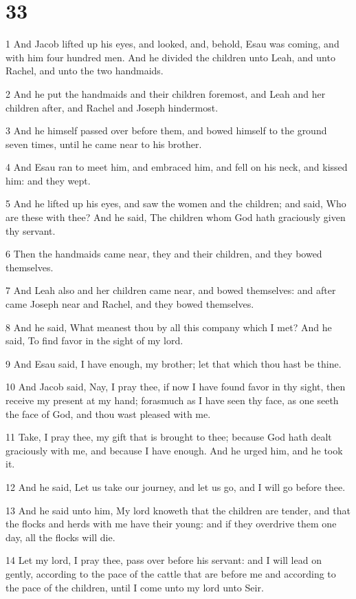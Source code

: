 \chapter{33}

\par 1 And Jacob lifted up his eyes, and looked, and, behold, Esau was coming, and with him four hundred men. And he divided the children unto Leah, and unto Rachel, and unto the two handmaids.
\par 2 And he put the handmaids and their children foremost, and Leah and her children after, and Rachel and Joseph hindermost.
\par 3 And he himself passed over before them, and bowed himself to the ground seven times, until he came near to his brother.
\par 4 And Esau ran to meet him, and embraced him, and fell on his neck, and kissed him: and they wept.
\par 5 And he lifted up his eyes, and saw the women and the children; and said, Who are these with thee? And he said, The children whom God hath graciously given thy servant.
\par 6 Then the handmaids came near, they and their children, and they bowed themselves.
\par 7 And Leah also and her children came near, and bowed themselves: and after came Joseph near and Rachel, and they bowed themselves.
\par 8 And he said, What meanest thou by all this company which I met? And he said, To find favor in the sight of my lord.
\par 9 And Esau said, I have enough, my brother; let that which thou hast be thine.
\par 10 And Jacob said, Nay, I pray thee, if now I have found favor in thy sight, then receive my present at my hand; forasmuch as I have seen thy face, as one seeth the face of God, and thou wast pleased with me.
\par 11 Take, I pray thee, my gift that is brought to thee; because God hath dealt graciously with me, and because I have enough. And he urged him, and he took it.
\par 12 And he said, Let us take our journey, and let us go, and I will go before thee.
\par 13 And he said unto him, My lord knoweth that the children are tender, and that the flocks and herds with me have their young: and if they overdrive them one day, all the flocks will die.
\par 14 Let my lord, I pray thee, pass over before his servant: and I will lead on gently, according to the pace of the cattle that are before me and according to the pace of the children, until I come unto my lord unto Seir.
